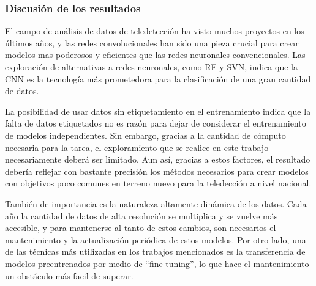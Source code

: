 \subsubsection*{Discusión de los resultados}

El campo de análisis de datos de teledetección ha visto muchos proyectos en los últimos años, y las redes
convolucionales han sido una pieza crucial para crear modelos mas poderosos y eficientes que las redes neuronales
convencionales. Las exploración de alternativas a redes neuronales, como RF y SVN, indica que la CNN es la tecnología
más prometedora para la clasificación de una gran cantidad de datos.

La posibilidad de usar datos sin etiquetamiento en el entrenamiento indica que la falta de datos etiquetados no es
razón para dejar de considerar el entrenamiento de modelos independientes. Sin embargo, gracias a la cantidad de
cómputo necesaria para la tarea, el exploramiento que se realice en este trabajo necesariamente deberá ser limitado.
Aun así, gracias a estos factores, el resultado debería reflejar con bastante precisión los métodos necesarios para
crear modelos con objetivos poco comunes en terreno nuevo para la teledección a nivel nacional.

También de importancia es la naturaleza altamente dinámica de los datos. Cada año la cantidad de datos de alta
resolución se multiplica y se vuelve más accesible, y para mantenerse al tanto de estos cambios, son necesarios el
mantenimiento y la actualización periódica de estos modelos. Por otro lado, una de las técnicas más utilizadas en los
trabajos mencionados es la transferencia de modelos preentrenados por medio de \enquote{fine-tuning}, lo que hace el
mantenimiento un obstáculo más facil de superar.

